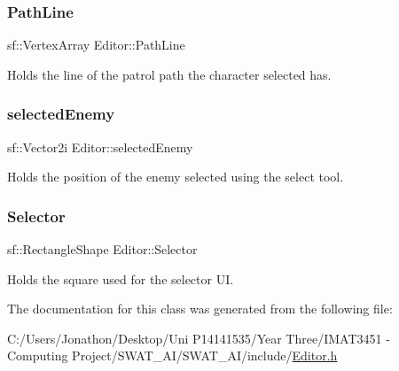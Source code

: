 \subsubsection{\texorpdfstring{Path\+Line}{PathLine}}
{\footnotesize\ttfamily sf\+::\+Vertex\+Array Editor\+::\+Path\+Line\hspace{0.3cm}{\ttfamily [private]}}



Holds the line of the patrol path the character selected has. 

\mbox{\label{class_editor_a10d877f02b735b8c21ba712bb9a9c24c}} 
\subsubsection{\texorpdfstring{selected\+Enemy}{selectedEnemy}}
{\footnotesize\ttfamily sf\+::\+Vector2i Editor\+::selected\+Enemy\hspace{0.3cm}{\ttfamily [private]}}



Holds the position of the enemy selected using the select tool. 

\mbox{\label{class_editor_a1b59487821fc37d571b402bc4c0586b8}} 
\subsubsection{\texorpdfstring{Selector}{Selector}}
{\footnotesize\ttfamily sf\+::\+Rectangle\+Shape Editor\+::\+Selector\hspace{0.3cm}{\ttfamily [private]}}



Holds the square used for the selector UI. 



The documentation for this class was generated from the following file\+:\begin{DoxyCompactItemize}
\item 
C\+:/\+Users/\+Jonathon/\+Desktop/\+Uni P14141535/\+Year Three/\+I\+M\+A\+T3451 -\/ Computing Project/\+S\+W\+A\+T\+\_\+\+A\+I/\+S\+W\+A\+T\+\_\+\+A\+I/include/\hyperlink{_editor_8h}{Editor.\+h}\end{DoxyCompactItemize}
